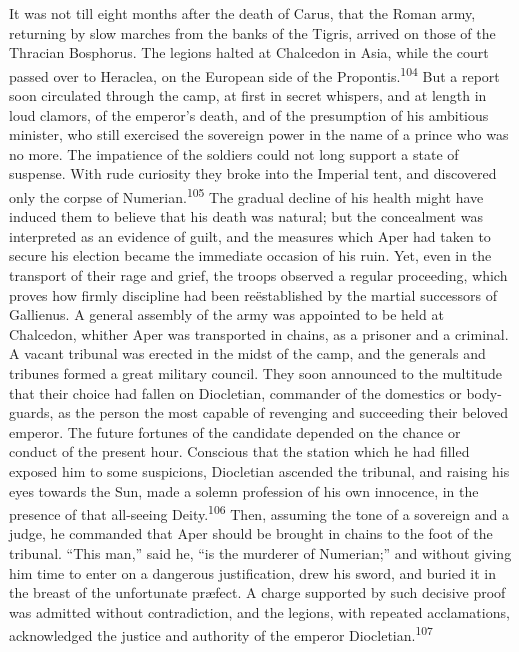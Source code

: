 It was not till eight months after the death of Carus, that the
Roman army, returning by slow marches from the banks of the
Tigris, arrived on those of the Thracian Bosphorus. The legions
halted at Chalcedon in Asia, while the court passed over to
Heraclea, on the European side of the Propontis.\textsuperscript{104} But a report
soon circulated through the camp, at first in secret whispers,
and at length in loud clamors, of the emperor’s death, and of the
presumption of his ambitious minister, who still exercised the
sovereign power in the name of a prince who was no more. The
impatience of the soldiers could not long support a state of
suspense. With rude curiosity they broke into the Imperial tent,
and discovered only the corpse of Numerian.\textsuperscript{105} The gradual
decline of his health might have induced them to believe that his
death was natural; but the concealment was interpreted as an
evidence of guilt, and the measures which Aper had taken to
secure his election became the immediate occasion of his ruin.
Yet, even in the transport of their rage and grief, the troops
observed a regular proceeding, which proves how firmly discipline
had been reëstablished by the martial successors of Gallienus. A
general assembly of the army was appointed to be held at
Chalcedon, whither Aper was transported in chains, as a prisoner
and a criminal. A vacant tribunal was erected in the midst of the
camp, and the generals and tribunes formed a great military
council. They soon announced to the multitude that their choice
had fallen on Diocletian, commander of the domestics or
body-guards, as the person the most capable of revenging and
succeeding their beloved emperor. The future fortunes of the
candidate depended on the chance or conduct of the present hour.
Conscious that the station which he had filled exposed him to
some suspicions, Diocletian ascended the tribunal, and raising
his eyes towards the Sun, made a solemn profession of his own
innocence, in the presence of that all-seeing Deity.\textsuperscript{106} Then,
assuming the tone of a sovereign and a judge, he commanded that
Aper should be brought in chains to the foot of the tribunal.
“This man,” said he, “is the murderer of Numerian;” and without
giving him time to enter on a dangerous justification, drew his
sword, and buried it in the breast of the unfortunate præfect. A
charge supported by such decisive proof was admitted without
contradiction, and the legions, with repeated acclamations,
acknowledged the justice and authority of the emperor Diocletian.\textsuperscript{107}


